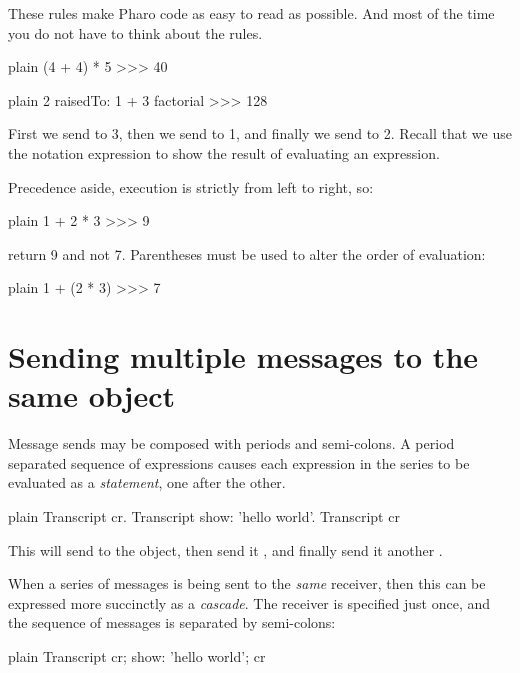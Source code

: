 \documentclass[10pt,twoside,english]{_support/latex/sbabook/sbabook}
\begin{document}
These rules make Pharo code as easy to read as possible. And most of the time you do not have to think about the rules.

\begin{displaycode}{plain}
(4 + 4) * 5
>>> 40
\end{displaycode}

\begin{displaycode}{plain}
2 raisedTo: 1 + 3 factorial
>>> 128
\end{displaycode}

First we send  to 3, then we send  to 1, and finally we
send  to 2. Recall that we use the notation expression \textcode{--\textgreater{}}
to show the result of evaluating an expression.

Precedence aside, execution is strictly from left to right, so:

\begin{displaycode}{plain}
1 + 2 * 3 
>>> 9
\end{displaycode}

return 9 and not 7. Parentheses must be used to alter the order of evaluation:

\begin{displaycode}{plain}
1 + (2 * 3) 
>>> 7
\end{displaycode}
\section{Sending multiple messages to the same object}
Message sends may be composed with periods and semi-colons. A period separated
sequence of expressions causes each expression in the series to be evaluated as
a \textit{statement}, one after the other.

\begin{displaycode}{plain}
Transcript cr.
Transcript show: 'hello world'.
Transcript cr
\end{displaycode}

This will send  to the  object, then send it , and finally send it another .

When a series of messages is being sent to the \textit{same} receiver, then this can
be expressed more succinctly as a \textit{cascade}. The receiver is specified just
once, and the sequence of messages is separated by semi-colons:

\begin{displaycode}{plain}
Transcript
  cr;
  show: 'hello world';
  cr
\end{displaycode}
\end{document}
